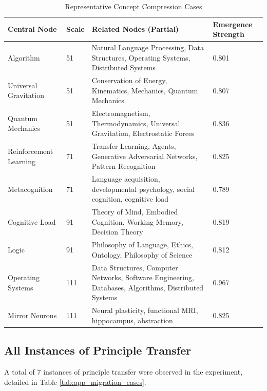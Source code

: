 \documentclass[10pt,onecolumn]{article}
\begin{document}
\begin{table}[H]
\footnotesize
\centering
\caption{Representative Concept Compression Cases}
\label{tab:app_compression_cases}
\begin{tabular}{p{2.5cm}p{1cm}p{4.5cm}p{2cm}}
\toprule
\textbf{Central Node} & \textbf{Scale} & \textbf{Related Nodes (Partial)} & \textbf{Emergence Strength} \\
\midrule
Algorithm & 51 & Natural Language Processing, Data Structures, Operating Systems, Distributed Systems & 0.801 \\
Universal Gravitation & 51 & Conservation of Energy, Kinematics, Mechanics, Quantum Mechanics & 0.807 \\
Quantum Mechanics & 51 & Electromagnetism, Thermodynamics, Universal Gravitation, Electrostatic Forces & 0.836 \\
\addlinespace
Reinforcement Learning & 71 & Transfer Learning, Agents, Generative Adversarial Networks, Pattern Recognition & 0.825 \\
Metacognition & 71 & Language acquisition, developmental psychology, social cognition, cognitive load & 0.789 \\
\addlinespace
Cognitive Load & 91 & Theory of Mind, Embodied Cognition, Working Memory, Decision Theory & 0.819 \\
Logic & 91 & Philosophy of Language, Ethics, Ontology, Philosophy of Science & 0.812 \\
\addlinespace
Operating Systems & 111 & Data Structures, Computer Networks, Software Engineering, Databases, Algorithms, Distributed Systems & 0.967 \\
Mirror Neurons & 111 & Neural plasticity, functional MRI, hippocampus, abstraction & 0.825 \\
\bottomrule
\end{tabular}
\end{table}

\subsection{All Instances of Principle Transfer}

A total of 7 instances of principle transfer were observed in the experiment, detailed in Table \ref{tab:app_migration_cases}.
\end{document}
